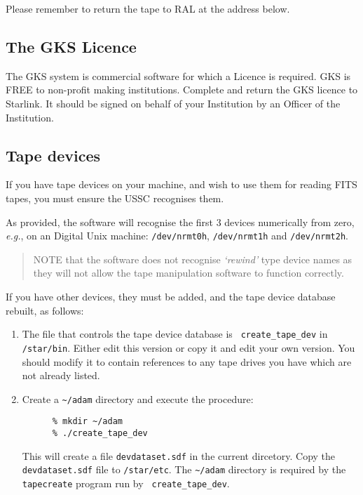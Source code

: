 Please remember to return the tape to RAL at the address below.

\subsection{The GKS Licence}
\label{s:setup:gks}

The GKS system is commercial software for which a Licence is required.
GKS is FREE to non-profit making institutions.  Complete and return the
GKS licence to Starlink.  It should be signed on behalf of your
Institution by an Officer of the Institution.

\subsection{Tape devices}
\label{s:setup:tapedev}

If you have tape devices on your machine, and wish to use them for reading
FITS tapes, you must ensure the USSC recognises them.

As provided, the software will recognise the first 3 devices numerically 
from zero, {\em e.g.}, on an Digital Unix machine: {\tt /dev/nrmt0h}, 
{\tt /dev/nrmt1h} and {\tt /dev/nrmt2h}.

\begin{quote}
NOTE that the software does not recognise {\it `rewind'} type device
names as they will not allow the tape manipulation software to function
correctly.
\end{quote}

If you have other devices, they must be added, and the tape device database
rebuilt, as follows:

\begin{enumerate}

\item The file that controls the tape device database is {\tt
create\_tape\_dev} in {\tt /star/bin}.  Either edit this version or
copy it and edit your own version.  You should modify it to contain
references to any tape drives you have which are not already listed.

\item Create a \verb+~/adam+ directory and execute the procedure:

\begin{verbatim}
      % mkdir ~/adam
      % ./create_tape_dev
\end{verbatim}

This will create a file {\tt devdataset.sdf} in the current dircetory.
Copy the {\tt devdataset.sdf} file to {\tt /star/etc}.  The \verb+~/adam+
directory is required by the {\tt tapecreate} program run by {\tt
create\_tape\_dev}.

\end{enumerate}

